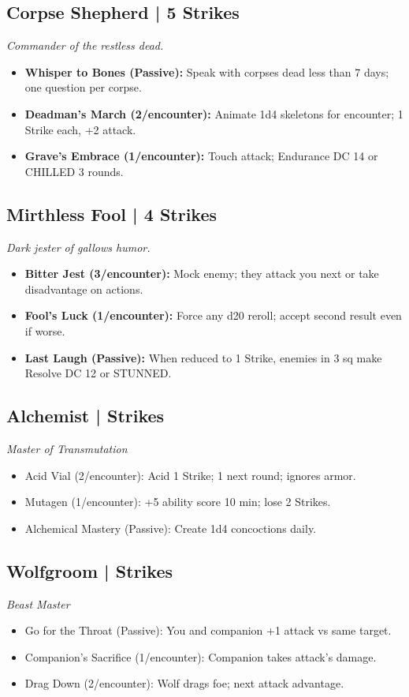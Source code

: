 \documentclass[10pt,twoside]{article}
\begin{document}
\begin{multicols}{2}
\subsection{Corpse Shepherd | 5 Strikes}
\textit{Commander of the restless dead.}
\begin{itemize}
\item \textbf{Whisper to Bones (Passive):} Speak with corpses dead less than 7 days; one question per corpse.
\item \textbf{Deadman's March (2/encounter):} Animate 1d4 skeletons for encounter; 1 Strike each, +2 attack.
\item \textbf{Grave's Embrace (1/encounter):} Touch attack; Endurance DC 14 or CHILLED 3 rounds.
\end{itemize}

\subsection{Mirthless Fool | 4 Strikes}
\textit{Dark jester of gallows humor.}
\begin{itemize}
\item \textbf{Bitter Jest (3/encounter):} Mock enemy; they attack you next or take disadvantage on actions.
\item \textbf{Fool's Luck (1/encounter):} Force any d20 reroll; accept second result even if worse.
\item \textbf{Last Laugh (Passive):} When reduced to 1 Strike, enemies in 3 sq make Resolve DC 12 or STUNNED.
\end{itemize}
\columnbreak

\subsection{Alchemist \;| Strikes}
\textit{Master of Transmutation}
\begin{itemize}
\item Acid Vial (2/encounter): Acid 1 Strike; 1 next round; ignores armor.
\item Mutagen (1/encounter): +5 ability score 10 min; lose 2 Strikes.
\item Alchemical Mastery (Passive): Create 1d4 concoctions daily.
\end{itemize}

\subsection{Wolfgroom \;| Strikes}
\textit{Beast Master}
\begin{itemize}
\item Go for the Throat (Passive): You and companion +1 attack vs same target.
\item Companion's Sacrifice (1/encounter): Companion takes attack's damage.
\item Drag Down (2/encounter): Wolf drags foe; next attack advantage.
\end{itemize}


\end{multicols}
\end{document}
